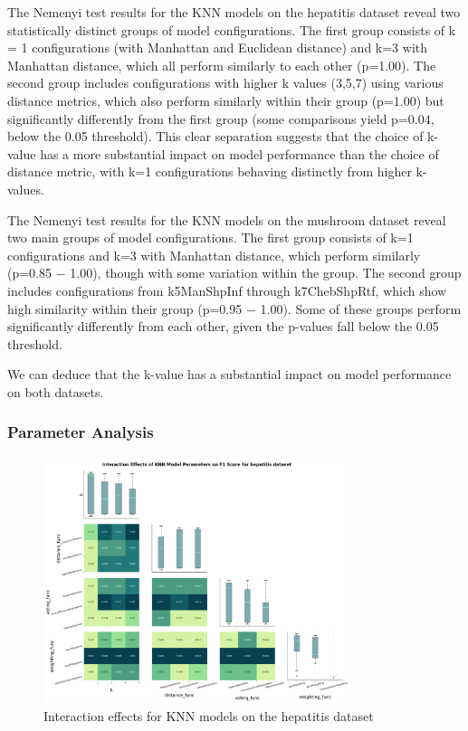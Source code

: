 The Nemenyi test results for the KNN models on the hepatitis dataset reveal two statistically distinct
groups of model configurations. The first group consists of k = 1 configurations
(with Manhattan and Euclidean distance) and k=3 with Manhattan distance, which all perform similarly to each other (p=1.00).
The second group includes configurations with higher k values (3,5,7) using various distance metrics,
which also perform similarly within their group (p=1.00) but significantly differently from the first
group (some comparisons yield p=0.04, below the 0.05 threshold). This clear separation suggests that the choice of k-value
has a more substantial impact on model performance than the choice of distance metric, with k=1 configurations behaving distinctly from higher k-values.

The Nemenyi test results for the KNN models on the mushroom dataset reveal two main groups of model configurations.
The first group consists of k=1 configurations and k=3 with Manhattan distance, which perform similarly
(p=0.85 $-$ 1.00), though with some variation within the group. The second group includes configurations
from k5ManShpInf through k7ChebShpRtf, which show high similarity within their group (p=0.95 $-$ 1.00).
Some of these groups perform significantly differently from each other, given the p-values fall below the 0.05 threshold.

We can deduce that the k-value has a substantial impact on model performance on both datasets. 

\subsubsection*{Parameter Analysis}

\begin{figure}[!ht]
    \centering
    \includegraphics[width=0.8\textwidth]{figures/interaction_effects_KNN_hepatitis.png}
    \caption{Interaction effects for KNN models on the hepatitis dataset}
\label{fig:interaction_effects_KNN_hepatitis}
\end{figure}

